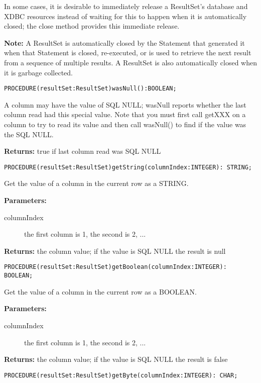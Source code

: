      In some cases, it is desirable to immediately release a ResultSet's database and XDBC resources instead of waiting for this to
     happen when it is automatically closed; the close method provides this immediate release. 

     {\bf Note: } A ResultSet is automatically closed by the Statement that generated it when that Statement is closed, re-executed, or is used to
     retrieve the next result from a sequence of multiple results. A ResultSet is also automatically closed when it is garbage collected. 


\verb'PROCEDURE(resultSet:ResultSet)wasNull():BOOLEAN;'

     A column may have the value of SQL NULL; wasNull reports whether the last column read had this special value. Note that you must
     first call getXXX on a column to try to read its value and then call wasNull() to find if the value was the SQL NULL. 

     {\bf Returns: } 
          true if last column read was SQL NULL 


\verb'PROCEDURE(resultSet:ResultSet)getString(columnIndex:INTEGER): STRING;'

     Get the value of a column in the current row as a STRING. 

     {\bf Parameters: } 
\begin{description}
\item[columnIndex] the first column is 1, the second is 2, ... 
\end{description}
     {\bf Returns: } 
          the column value; if the value is SQL NULL the result is null 


\verb'PROCEDURE(resultSet:ResultSet)getBoolean(columnIndex:INTEGER): BOOLEAN;'

     Get the value of a column in the current row as a BOOLEAN. 

     {\bf Parameters: } 
\begin{description}
\item[columnIndex] the first column is 1, the second is 2, ... 
\end{description}

     {\bf Returns: } 
          the column value; if the value is SQL NULL the result is false 


\verb'PROCEDURE(resultSet:ResultSet)getByte(columnIndex:INTEGER): CHAR;'

